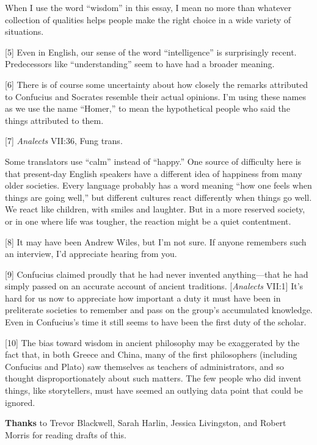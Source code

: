 When I use the word ``wisdom'' in this essay, I mean no more than
whatever collection of qualities helps people make the right choice in a
wide variety of situations.

{[}5{]} Even in English, our sense of the word ``intelligence'' is
surprisingly recent. Predecessors like ``understanding'' seem to have
had a broader meaning.

{[}6{]} There is of course some uncertainty about how closely the
remarks attributed to Confucius and Socrates resemble their actual
opinions. I'm using these names as we use the name ``Homer,'' to mean
the hypothetical people who said the things attributed to them.

{[}7{]} \emph{Analects} VII:36, Fung trans.

Some translators use ``calm'' instead of ``happy.'' One source of
difficulty here is that present-day English speakers have a different
idea of happiness from many older societies. Every language probably has
a word meaning ``how one feels when things are going well,'' but
different cultures react differently when things go well. We react like
children, with smiles and laughter. But in a more reserved society, or
in one where life was tougher, the reaction might be a quiet
contentment.

{[}8{]} It may have been Andrew Wiles, but I'm not sure. If anyone
remembers such an interview, I'd appreciate hearing from you.

{[}9{]} Confucius claimed proudly that he had never invented
anything---that he had simply passed on an accurate account of ancient
traditions. {[}\emph{Analects} VII:1{]} It's hard for us now to
appreciate how important a duty it must have been in preliterate
societies to remember and pass on the group's accumulated knowledge.
Even in Confucius's time it still seems to have been the first duty of
the scholar.

{[}10{]} The bias toward wisdom in ancient philosophy may be exaggerated
by the fact that, in both Greece and China, many of the first
philosophers (including Confucius and Plato) saw themselves as teachers
of administrators, and so thought disproportionately about such matters.
The few people who did invent things, like storytellers, must have
seemed an outlying data point that could be ignored.

\textbf{Thanks} to Trevor Blackwell, Sarah Harlin, Jessica Livingston,
and Robert Morris for reading drafts of this.
